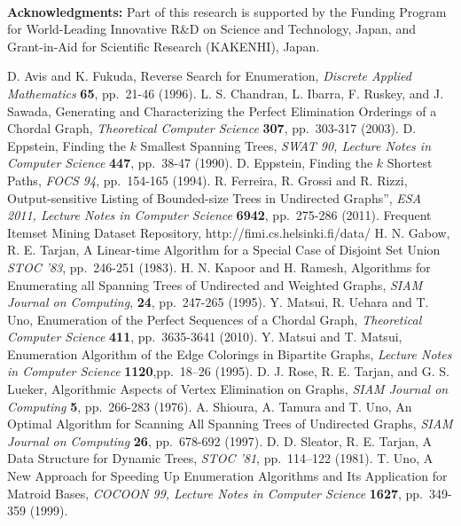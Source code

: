 \documentclass{llncs}
\begin{document}
\ \\
\noindent
{\bf \large Acknowledgments: }
Part of this research is supported by the Funding Program for World-Leading
 Innovative R\&D on Science and Technology, Japan, and Grant-in-Aid for
 Scientific Research (KAKENHI), Japan.


\vspace{-3mm}
\begin{thebibliography}{99}
\vspace{-4mm}
 D. Avis and K. Fukuda, 
  Reverse Search for Enumeration,
  {\it Discrete Applied Mathematics} {\bf 65}, pp.~21-46 (1996).
 L. S. Chandran, L. Ibarra, F. Ruskey, and J. Sawada, 
  Generating and Characterizing the Perfect Elimination Orderings of a
  Chordal Graph,
  {\it Theoretical Computer Science} {\bf 307}, pp.~303-317 (2003).
 D. Eppstein,
  Finding the $k$ Smallest Spanning Trees,
  {\it SWAT 90, Lecture Notes in Computer Science} {\bf 447}, pp.~38-47 (1990).
 D. Eppstein,
  Finding the $k$ Shortest Paths,
  {\it FOCS 94}, pp.~154-165 (1994).
 R. Ferreira, R. Grossi and R. Rizzi,
  Output-sensitive Listing of Bounded-size Trees in Undirected Graphs'',
  {\it ESA 2011, Lecture Notes in Computer Science} {\bf 6942},
   pp.~275-286 (2011).
 Frequent Itemset Mining Dataset Repository, http://fimi.cs.helsinki.fi/data/
 H. N. Gabow, R. E. Tarjan,
  A Linear-time Algorithm for a Special Case of Disjoint Set Union
  {\it STOC '83}, pp.~246-251 (1983).
 H. N. Kapoor and H. Ramesh, 
  Algorithms for Enumerating all Spanning Trees of Undirected and Weighted
  Graphs,
  {\it SIAM Journal on Computing}, {\bf 24}, pp.~247-265 (1995).
 Y. Matsui, R. Uehara and T. Uno,
  Enumeration of the Perfect Sequences of a Chordal Graph,
  {\it Theoretical Computer Science} {\bf411}, pp.~3635-3641 (2010).
 Y. Matsui and T. Matsui,
  Enumeration Algorithm of the Edge Colorings in Bipartite Graphs,
  {\it Lecture Notes in Computer Science} {\bf 1120},pp.~18--26 (1995).
 D. J. Rose, R. E. Tarjan, and G. S. Lueker,
  Algorithmic Aspects of Vertex Elimination on Graphs,
  {\it SIAM Journal on Computing} {\bf 5}, pp.~266-283 (1976).
 A. Shioura, A. Tamura and T. Uno, 
  An Optimal Algorithm for Scanning All Spanning Trees of Undirected Graphs,
  {\it SIAM Journal on Computing} {\bf 26}, pp.~678-692 (1997).
 D. D. Sleator, R. E. Tarjan, 
  A Data Structure for Dynamic Trees, 
  {\it STOC '81}, pp.~114--122 (1981).
 T. Uno, 
  A New Approach for Speeding Up Enumeration Algorithms and Its Application
  for Matroid Bases, {\it COCOON 99,
  Lecture Notes in Computer Science} {\bf 1627}, pp.~349-359 (1999).

\end{thebibliography}
\end{document}

